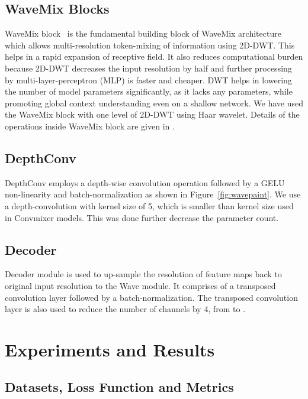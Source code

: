 \documentclass{article}
\begin{document}
\subsection{WaveMix Blocks}

WaveMix block~\cite{jeevan2023wavemix} is the fundamental building block of WaveMix architecture which allows multi-resolution token-mixing of information using 2D-DWT. This helps in a rapid expansion of receptive field. It also reduces computational burden because 2D-DWT decreases the input resolution by half and further processing by multi-layer-perceptron (MLP) is faster and cheaper. DWT helps in lowering the number of model parameters significantly, as it lacks any parameters, while promoting global context understanding even on a shallow network. We have used the WaveMix block with one level of 2D-DWT using Haar wavelet. Details of the operations inside WaveMix block are given in \cite{jeevan2023wavemix}. 

\subsection{DepthConv}

DepthConv employs a depth-wise convolution operation followed by a GELU non-linearity and batch-normalization as shown in Figure~\ref{fig:wavepaint}. We use a depth-convolution with kernel size of 5, which is smaller than kernel size used in Convmixer models. This was done further decrease the parameter count. 

\subsection{Decoder}

Decoder module is used to up-sample the resolution of feature maps back to original input resolution to the Wave module. It comprises of a transposed convolution layer followed by a batch-normalization. The transposed convolution layer is also used to reduce the number of channels by 4, from  to . 




\section{Experiments and Results}

\subsection{Datasets, Loss Function and Metrics}
\end{document}
